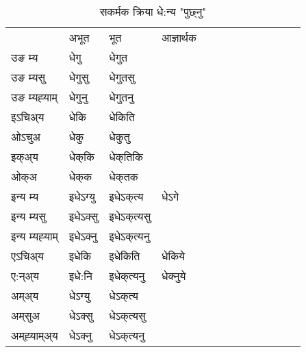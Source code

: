\begin{table}[H]
\centering
\caption{\label{ek.vt} सकर्मक क्रिया  धे:न्य  "पुछ्नु"  }
\begin{tabular}{l|l|l|l|l|l|l|l|l|l|l|l|l}  \toprule
&अभूत & भूत & आज्ञार्थक \\ 
उङ म्य &धेगु &धेगुत \\ 
उङ म्यसु &धेगुसु &धेगुतसु \\ 
उङ म्यह्‍याम् &धेगुनु &धेगुतनु \\ 
इऽचिअ्य  &धेकि &धेकिति   \\ 
ओऽचुअ &धेकु &धेकुतु   \\ 
इक्अ्य &धेक्‌कि &धेक्‌तिकि   \\ 
ओक्अ &धेक्‌क &धेक्‌तक   \\ 
इन्य म्य& इधेऽग्यु  & इधेऽक्‌त्य &धेऽगे  \\ 
इन्य म्यसु & इधेऽक्सु  & इधेऽक्‌त्यसु   \\ 
इन्य म्यह्‍याम् & इधेऽक्‍नु  & इधेऽक्‌त्यनु   \\ 
एऽचिअ्य & इधेकि & इधेकिति &धेकिये    \\ 
ए:न्अ्य & इधे:नि  & इधेक्‌त्यनु &धेक्‍नुये  \\ 
अम्अ्य & धेऽग्यु  & धेऽक्‌त्य  \\ 
अम्‌सुअ & धेऽक्सु & धेऽक्‌त्यसु  \\ 
अम्‌ह्‍याम्अ्य & धेऽक्‍नु  & धेऽक्‌त्यनु \\ 
\bottomrule
\end{tabular}
\end{table}


